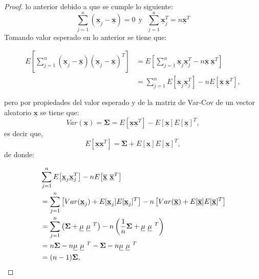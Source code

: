 \documentclass[
]{book}
\theoremstyle{definition}
\theoremstyle{definition}
\theoremstyle{definition}
\theoremstyle{definition}
\theoremstyle{remark}
\begin{document}
\begin{proof}
lo anterior debido a que se cumple lo siguiente:
\[
\sum_{j=1}^n(\underline{\mathbf{x}}_j - \underline{\overline{\mathbf{x}}})=0 \ \ \text{y} \ \ \ \sum_{j=1}^n\underline{\mathbf{x}}_j^T=n\underline{\overline{\mathbf{x}}}^T
\]
Tomando valor esperado en lo anterior se tiene que:

\begin{align*}
E\left[\sum_{j=1}^n(\underline{\mathbf{x}}_j - \underline{\overline{\mathbf{x}}})(\underline{\mathbf{x}}_j - \underline{\overline{\mathbf{x}}})^T \right] &= E \left[ \sum_{j=1}^n\underline{\mathbf{x}}_j\underline{\mathbf{x}}_j^T-n\underline{\overline{\mathbf{x}}}\ \underline{\overline{\mathbf{x}}}^T \right]\\
& = \sum_{j=1}^nE[\underline{\mathbf{x}}_j\underline{\mathbf{x}}_j^T]-nE[\underline{\overline{\mathbf{x}}}\ \underline{\overline{\mathbf{x}}}^T],
\end{align*}

pero por propiedades del valor esperado y de la matriz de Var-Cov de un vector aleatorio \(\underline{\mathbf{x}}\) se tiene que:
\[
Var(\underline{\mathbf{x}})=\mathbf{\Sigma}=E[\underline{\mathbf{x}}\underline{\mathbf{x}}^T]-E[\underline{\mathbf{x}}]E[\underline{\mathbf{x}}]^T,
\]
es decir que,
\[
E[\underline{\mathbf{x}}\underline{\mathbf{x}}^T]=
\mathbf{\Sigma}+ E[\underline{\mathbf{x}}]E[\underline{\mathbf{x}}]^T,
\]
de donde:

\begin{align*}
&\sum_{j=1}^nE\bigl[\underline{\mathbf{x}}_j\underline{\mathbf{x}}_j^T\bigr]-nE\bigl[\underline{\overline{\mathbf{x}}}\ \underline{\overline{\mathbf{x}}}^T\bigr]\\
&=\sum_{j=1}^n \left[ Var(\underline{\mathbf{x}}_j) + E[\underline{\mathbf{x}}_j]E[\underline{\mathbf{x}}_j]^T \right] - n\left[ Var(\underline{\overline{\mathbf{x}}})+ E[\underline{\overline{\mathbf{x}}}]E[\underline{\overline{\mathbf{x}}}]^T \right]  \\
&= \sum_{j=1}^n \left( \mathbf{\Sigma} +
{\large \underline{\mathbf{\mu}}}\ 
{\large \underline{\mathbf{\mu}}}\ ^T \right) -
  n\left(\frac{1}{n}\mathbf{\Sigma} + 
{\large \underline{\mathbf{\mu}}}\ 
{\large \underline{\mathbf{\mu}}}\ ^T \right)\\
&=n\mathbf{\Sigma} -n
{\large \underline{\mathbf{\mu}}}\ 
{\large \underline{\mathbf{\mu}}}\ ^T -\mathbf{\Sigma} -n
{\large \underline{\mathbf{\mu}}}\ 
{\large \underline{\mathbf{\mu}}}\ ^T\\
&=(n-1)\mathbf{\Sigma},
\end{align*}


\end{proof}
\end{document}
